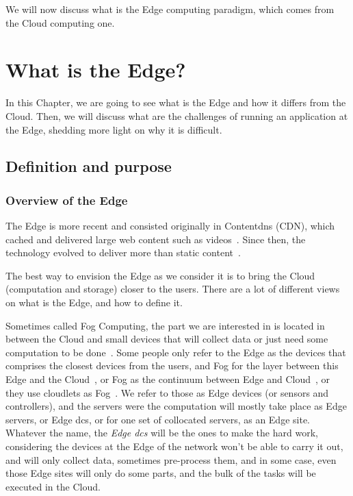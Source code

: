 We will now discuss what is the Edge computing paradigm, which comes
from the Cloud computing one.


\chapter{What is the Edge?} %
\label{chap:edge}

In this Chapter, we are going to see what is the Edge and how it
differs from the Cloud.
%
Then, we will discuss what are the challenges of running an
application at the Edge, shedding more light on why it is difficult.

\section{Definition and purpose} %
\label{sec:edge-def}

\subsection{Overview of the Edge}

The Edge is more recent and consisted originally in \glspl{Contentdn}
(\acrshort{CDN}), which \gls{cache}d and delivered large web content
such as videos~\cite{DPW04}. Since then, the technology evolved to deliver more than
static content~\cite{NSS10}.


The best way to envision the Edge as we consider it is to bring the
Cloud (computation and storage) closer to the users.
%
There are a lot of different views on what is the Edge, and how to
define it.%

%
Sometimes called Fog Computing, the part we are interested in is
located in between the Cloud \dcs and small devices that will collect
data or just need some computation to be done~\cite{SPDSM21}.
%
Some people only refer to the Edge as the devices that comprises the
closest devices from the users, and Fog for the layer between this
Edge and the Cloud~\cite{WVMN17}, or Fog as the continuum between Edge
and Cloud~\cite{MWTDV19}, or they use \glspl{cloudlet} as
Fog~\cite{SBCD09}.
%
We refer to those as Edge devices (or sensors and controllers), and
the \glspl{server} were the computation will mostly take place as Edge
\glspl{server}, or Edge \glspl{dc}, or for one set of collocated
\glspl{server}, as an Edge site.
%
Whatever the name, the \emph{Edge \glspl{dc}} will be the ones to
make the hard work, considering the devices at the Edge of the network
won't be able to carry it out, and will only collect data, sometimes
pre-process them\cite{SGDR21, TSS21, WFGI+19}, and in some case, even
those Edge sites will only do some parts, and the bulk of the tasks
will be executed in the Cloud.
%


